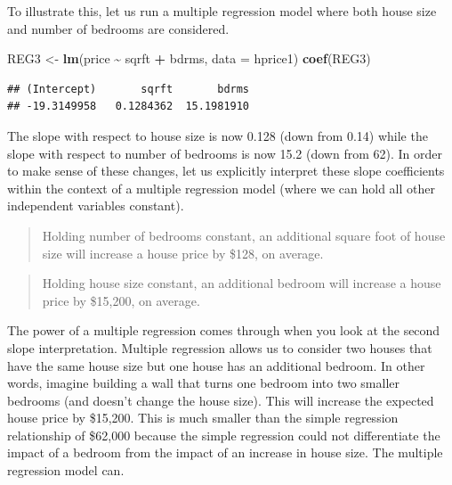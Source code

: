 \documentclass[
]{book}
\newenvironment{Shaded}{\begin{snugshade}}{\end{snugshade}}
\newcommand{\AttributeTok}[1]{\textcolor[rgb]{0.13,0.29,0.53}{#1}}
\newcommand{\FunctionTok}[1]{\textcolor[rgb]{0.13,0.29,0.53}{\textbf{#1}}}
\newcommand{\NormalTok}[1]{#1}
\newcommand{\OtherTok}[1]{\textcolor[rgb]{0.56,0.35,0.01}{#1}}
\newcommand{\SpecialCharTok}[1]{\textcolor[rgb]{0.81,0.36,0.00}{\textbf{#1}}}
\begin{document}
To illustrate this, let us run a multiple regression model where both house size and number of bedrooms are considered.

\begin{Shaded}
\begin{Highlighting}[]
\NormalTok{REG3 }\OtherTok{\textless{}{-}} \FunctionTok{lm}\NormalTok{(price }\SpecialCharTok{\textasciitilde{}}\NormalTok{ sqrft }\SpecialCharTok{+}\NormalTok{ bdrms, }\AttributeTok{data =}\NormalTok{ hprice1)}
\FunctionTok{coef}\NormalTok{(REG3)}
\end{Highlighting}
\end{Shaded}

\begin{verbatim}
## (Intercept)       sqrft       bdrms 
## -19.3149958   0.1284362  15.1981910
\end{verbatim}

The slope with respect to house size is now 0.128 (down from 0.14) while the slope with respect to number of bedrooms is now 15.2 (down from 62). In order to make sense of these changes, let us explicitly interpret these slope coefficients within the context of a multiple regression model (where we can hold all other independent variables constant).

\begin{quote}
Holding number of bedrooms constant, an additional square foot of house size will increase a house price by \$128, on average.
\end{quote}

\begin{quote}
Holding house size constant, an additional bedroom will increase a house price by \$15,200, on average.
\end{quote}

The power of a multiple regression comes through when you look at the second slope interpretation. Multiple regression allows us to consider two houses that have the same house size but one house has an additional bedroom. In other words, imagine building a wall that turns one bedroom into two smaller bedrooms (and doesn't change the house size). This will increase the expected house price by \$15,200. This is much smaller than the simple regression relationship of \$62,000 because the simple regression could not differentiate the impact of a bedroom from the impact of an increase in house size. The multiple regression model can.
\end{document}
